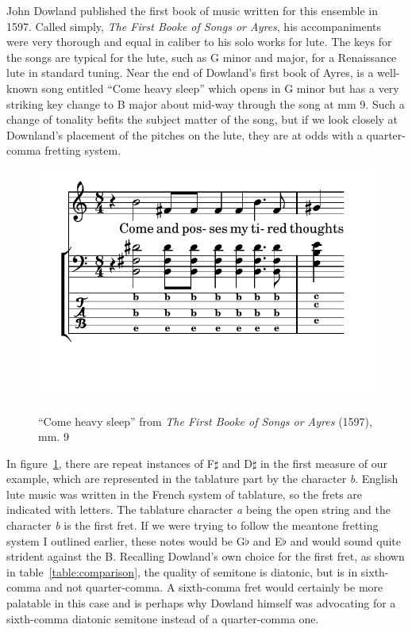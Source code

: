 John Dowland published the first book of music written for this ensemble in 1597.
Called simply, \textit{The First Booke of Songs or Ayres}, his accompaniments were very
thorough and equal in caliber to his solo works for lute.  The keys for the songs are
typical for the lute, such as G minor and major, for a Renaissance lute in standard
tuning. Near the end of Dowland's first book of Ayres, is a well-known song entitled
``Come heavy sleep'' which opens in G minor but has a very striking key change to B
major about mid-way through the song at mm 9. Such a change of tonality befits the
subject matter of the song, but if we look closely at Downland's placement of the
pitches on the lute, they are at odds with a quarter-comma fretting system.
\begin{figure}[h]
\centering
\includegraphics{examples/come.pdf}
\label{dowland-come}
\caption{``Come heavy sleep'' from \textit{The First Booke of Songs or Ayres} (1597), mm. 9}
\end{figure}
In figure~\ref{dowland-come}, there are repeat instances of F$\sharp$ and D$\sharp$ in the
first measure of our example, which are represented in the tablature part by the character
\textit{b}.  English lute music was written in the French system of tablature, so the
frets are indicated with letters.  The tablature character \textit{a} being the open
string and the character \textit{b} is the first fret.  If we were trying to follow the
meantone fretting system I outlined earlier, these notes would be G$\flat$ and E$\flat$
and would sound quite strident against the B.  Recalling Dowland's own choice for the
first fret, as shown in table~\ref{table:comparison}, the quality of semitone is diatonic,
but is in sixth-comma and not quarter-comma.  A sixth-comma fret would certainly be more
palatable in this case and is perhaps why Dowland himself was advocating for a sixth-comma
diatonic semitone instead of a quarter-comma one.

